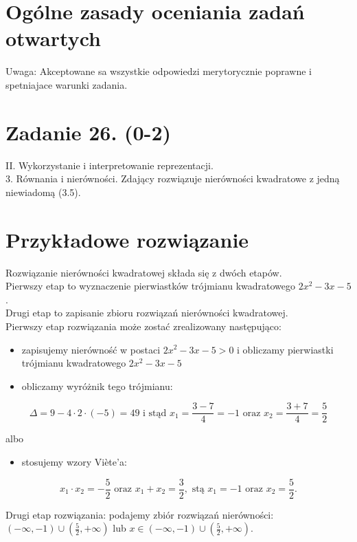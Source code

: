 \documentclass[10pt]{article}
\begin{document}
\section*{Ogólne zasady oceniania zadań otwartych}
Uwaga: Akceptowane sa wszystkie odpowiedzi merytorycznie poprawne i spetniajace warunki zadania.

\section*{Zadanie 26. (0-2)}
II. Wykorzystanie i interpretowanie reprezentacji.\\
3. Równania i nierówności. Zdający rozwiązuje nierówności kwadratowe z jedną niewiadomą (3.5).

\section*{Przykładowe rozwiązanie}
Rozwiązanie nierówności kwadratowej składa się z dwóch etapów.\\
Pierwszy etap to wyznaczenie pierwiastków trójmianu kwadratowego $2 x^{2}-3 x-5$.\\
Drugi etap to zapisanie zbioru rozwiązań nierówności kwadratowej.\\
Pierwszy etap rozwiązania może zostać zrealizowany następująco:

\begin{itemize}
  \item zapisujemy nierówność w postaci $2 x^{2}-3 x-5>0$ i obliczamy pierwiastki trójmianu kwadratowego $2 x^{2}-3 x-5$
  \item obliczamy wyróżnik tego trójmianu:
\end{itemize}

$$
\Delta=9-4 \cdot 2 \cdot(-5)=49 \text { i stąd } x_{1}=\frac{3-7}{4}=-1 \text { oraz } x_{2}=\frac{3+7}{4}=\frac{5}{2}
$$

albo

\begin{itemize}
  \item stosujemy wzory Viète'a:
\end{itemize}

$$
x_{1} \cdot x_{2}=-\frac{5}{2} \text { oraz } x_{1}+x_{2}=\frac{3}{2}, \text { stą } x_{1}=-1 \text { oraz } x_{2}=\frac{5}{2} .
$$

Drugi etap rozwiązania: podajemy zbiór rozwiązań nierówności: $(-\infty,-1) \cup\left(\frac{5}{2},+\infty\right)$ lub $x \in(-\infty,-1) \cup\left(\frac{5}{2},+\infty\right)$.
\end{document}
